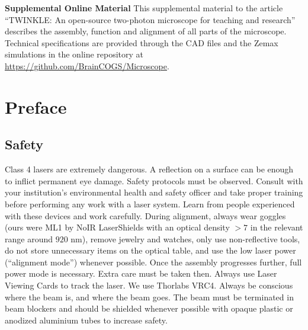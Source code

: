\documentclass[10pt,letterpaper]{article}
\begin{document}
\vspace*{0.2in}

{
\centering\Large\textbf{Supplemental Online Material} 
}
\newline\newline
This supplemental material to the article ``TWINKLE: An open-source two-photon microscope for teaching and research'' describes the assembly, function and alignment of all parts of the microscope. Technical specifications are provided through the CAD files and the Zemax simulations in the online repository at \url{https://github.com/BrainCOGS/Microscope}.

\tableofcontents
\newpage

\linenumbers

\section{Preface}

\subsection{Safety}
Class 4 lasers are extremely dangerous. A reflection on a surface can be enough to inflict permanent eye damage. Safety protocols must be observed. Consult with your institution's environmental health and safety officer and take proper training before performing any work with a laser system. Learn from people experienced with these devices and work carefully.\newline
During alignment, always wear goggles (ours were ML1 by NoIR LaserShields with an optical density $>7$ in the relevant range around $920\text{ nm}$), remove jewelry and watches, only use non-reflective tools, do not store unnecessary items on the optical table, and use the low laser power (“alignment mode”) whenever possible. Once the assembly progresses further, full power mode is necessary. Extra care must be taken then. Always use Laser Viewing Cards to track the laser. We use Thorlabs VRC4. Always be conscious where the beam is, and where the beam goes. The beam must be terminated in beam blockers and should be shielded whenever possible with opaque plastic or anodized aluminium tubes to increase safety.
\end{document}

